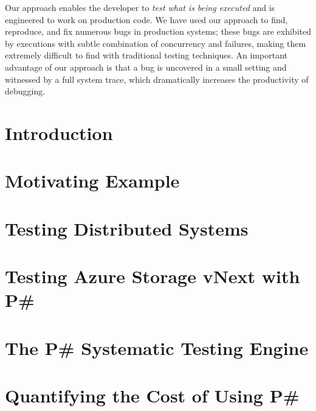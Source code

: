 \documentclass[letterpaper,twocolumn,10pt]{article}
\newcommand{\psharp}{P\#\xspace}
\begin{document}
Our approach enables the developer to \emph{test what is being executed} and is engineered to work on production code.
We have used our approach to find, reproduce, and fix numerous bugs in production systems;
these bugs are exhibited by executions with subtle combination of concurrency and failures, making them extremely difficult
to find with traditional testing techniques.
An important advantage of our approach is that a bug is uncovered in a small setting and witnessed by a full system trace,
which dramatically increases the productivity of debugging.

\section{Introduction}
\label{sec:intro}



\section{Motivating Example}
\label{sec:motivation}



\section{Testing Distributed Systems}
\label{sec:overview}



\section{Testing Azure Storage vNext with \psharp}
\label{sec:method}



\section{The \psharp Systematic Testing Engine}
\label{sec:psharp}






\section{Quantifying the Cost of Using \psharp}
\label{sec:eval}
\end{document}
